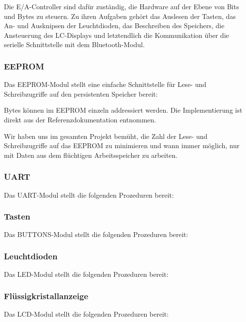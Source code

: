\documentclass[ngerman]{article}
\begin{document}
Die E/A-Controller sind dafür zuständig, die Hardware auf der Ebene von Bits und Bytes zu
steuern. Zu ihren Aufgaben gehört das Auslesen der Tasten, das An-
und Ausknipsen der Leuchtdioden,  das Beschreiben des Speichers,
die Ansteuerung des LC-Displays und letztendlich die Kommunikation über
die serielle Schnittstelle mit dem Bluetooth-Modul.

\subsubsection{EEPROM}

Das EEPROM-Modul stellt eine einfache Schnittstelle für Lese- und Schreibzugriffe
auf den persistenten Speicher bereit: 


Bytes können im EEPROM einzeln addressiert werden. Die Implementierung ist direkt
aus der Referenzdokumentation entnommen.

Wir haben uns im gesamten Projekt bemüht, die Zahl der Lese- und
Schreibzugriffe auf das EEPROM zu minimieren und wann immer möglich,
nur mit Daten aus dem flüchtigen Arbeitsspeicher zu
arbeiten.

\subsubsection{UART}

Das UART-Modul stellt die folgenden Prozeduren bereit:



\subsubsection{Tasten}

Das BUTTONS-Modul stellt die folgenden Prozeduren bereit:



\subsubsection{Leuchtdioden}

Das LED-Modul stellt die folgenden Prozeduren bereit:



\subsubsection{Flüssigkristallanzeige}

Das LCD-Modul stellt die folgenden Prozeduren bereit:

\end{document}
